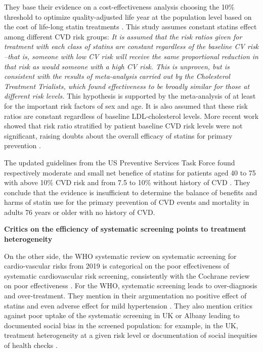 \documentclass[10pt,letterpaper]{article}
\begin{document}
They base their evidence on a cost-effectiveness analysis choosing the 10\%
threshold to optimize quality-adjusted life year at the population level based
on the cost of life-long statin treatments \cite{guthrie2023competing}. This
study assumes constant statins effect among different CVD risk groups:
\emph{It is assumed that the risk ratios given for treatment with each class
  of statins are constant regardless of the baseline CV risk --that is, someone
  with low CV risk will receive the same proportional reduction in that risk as
  would someone with a high CV risk. This is unproven, but is consistent with
  the results of meta-analysis carried out by the Cholesterol Treatment
  Trialists, which found effectiveness to be broadly similar for those at
  different risk levels.} This hypothesis is supported by the meta-analysis of
\cite{brugts2009benefits} at least for the important risk factors of sex and
age. It is also assumed that these risk ratios are constant regardless of
baseline LDL-cholesterol levels. More recent work showed that risk ratio
stratified by patient baseline CVD risk levels were not significant, raising
doubts about the overall efficacy of statins for primary prevention \cite[Table 1]{byrne2019statins}.

The updated guidelines from the US Preventive Services Task Force found
respectively moderate and small net benefice of statins for patients aged 40
to 75 with above 10\% CVD risk and from 7.5 to 10\% without history of CVD
\cite{chou2022statin}. They conclude that the evidence is insufficient to
determine the balance of benefits and harms of statin use for the primary
prevention of CVD events and mortality in adults 76 years or older with no
history of CVD.


\textbf{Critics on the efficiency of systematic screening points to treatment heterogeneity}

On the other side, the WHO systematic review on systematic screening for
cardio-vascular risks from 2019 \cite{eriksen2021effectiveness} is
categorical on the poor effectiveness of systematic cardiovascular risk
screening, consistently with the Cochrane review on poor effectiveness
\cite{krogsboll2012general}. For the WHO, systematic screening leads to
over-diagnosis and over-treatment. They mention in their argumentation no
positive effect of statins and even adverse effect for mild hypertension
\cite{diao2012pharmacotherapy}. They also mention critics against poor
uptake of the systematic screening in UK or Albany leading to documented
social bias in the screened population: for example, in the UK, treatment
heterogeneity at a given risk level \cite{van2013efficiency} or documentation
of social inequities of health checks \cite{krska2016implementation}.
\end{document}
